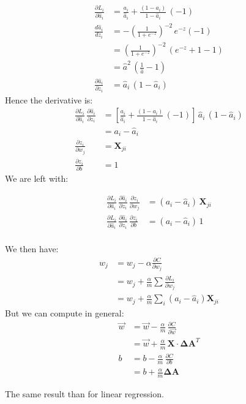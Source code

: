 \begin{align*}
  \frac{\partial L_i}{\partial \hat{a}_i} &= \frac{a_i}{\hat{a}_i} + \frac{(1-a_i)}{1-\hat{a}_i}\,(-1) \\
  \frac{d\hat{a}_i}{dz_i}&=-\left(\frac{1}{1+e^{-z}}\right)^{-2}\,e^{-z}(-1)\\
  &=\left(\frac{1}{1+e^{-z}}\right)^{-2}\,(e^{-z} + 1 -1)\\
  &= \hat{a}^2\,(\frac{1}{\hat{a}} -1) \\
  \frac{\partial \hat{a}_i}{\partial z_i} &= \hat{a}_i\,(1-\hat{a}_i)
\end{align*}
Hence the derivative is:
\begin{align*}
  \frac{\partial L_i}{\partial \hat{a}_i}\,\frac{\partial \hat{a}_i}{\partial z_i} &= \left[ \frac{a_i}{\hat{a}_i} + \frac{(1-a_i)}{1-\hat{a}_i}\,(-1) \right]\,\hat{a}_i\,(1-\hat{a}_i)\\
  &= a_i - \hat{a}_i\\
  \frac{\partial z_i}{\partial w_j} &= \mathbf{X}_{ji}\\
  \frac{\partial z_i}{\partial b} &= 1
\end{align*}
We are left with:

\begin{align*}
  \frac{\partial L_i}{\partial \hat{a}_i}\,\frac{\partial \hat{a}_i}{\partial z_i}\,\frac{\partial z_i}{\partial w_j} &= \left(a_i - \hat{a}_i\right)\,\mathbf{X}_{ji}\\
  \frac{\partial L_i}{\partial \hat{a}_i}\,\frac{\partial \hat{a}_i}{\partial z_i}\,\frac{\partial z_i}{\partial b} &= \left(a_i - \hat{a}_i\right)\,1\\
\end{align*}

We then have:
\begin{align*}
  w_j &= w_j - \alpha\frac{\partial C}{\partial w_j}\\
  &= w_j + \frac{\alpha}{m}\sum \frac{\partial L_i}{\partial w_j}\label{eq:same}\\
  &= w_j + \frac{\alpha}{m}\sum_i (a_i-\hat{a}_i)\mathbf{X}_{ji}
\end{align*}
But we can compute in general:
\begin{align}
  \vec{w} &= \vec{w} - \frac{\alpha}{m}\,\frac{\partial C}{\partial \vec{w}}\nonumber\\
  &= \vec{w} + \frac{\alpha}{m}\,\mathbf{X}\cdot{}\mathbf{\Delta A}^T\\
  b &= b - \frac{\alpha}{m}\,\frac{\partial C}{\partial b}\nonumber\\
  &= b + \frac{\alpha}{m}\mathbf{\Delta A}
\end{align}

The same result than for linear regression. 
